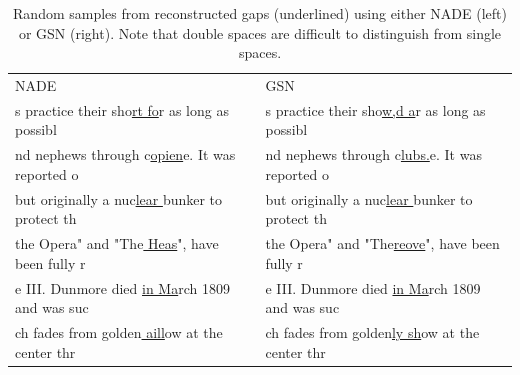 \documentclass{article}
\newenvironment{bookman}{\scriptsize\fontfamily{bch}\selectfont}{\par}
\begin{document}
\begin{table}[t]
\caption{
Random samples from reconstructed gaps (underlined) using either NADE (left) or 
GSN (right). Note that double spaces are difficult to distinguish from single 
spaces.
}
\centering
\begin{tabular}{ l  l }
\hline
\noalign{\smallskip}
NADE  & GSN \\
\noalign{\smallskip}
\hline
\noalign{\smallskip}
\begin{bookman} s practice their sho\underline{rt fo}r as long as possibl \end{bookman}  & \begin{bookman} s practice their sho\underline{w,d a}r as long as possibl \end{bookman}  \\
\begin{bookman} nd nephews through c\underline{opien}e. It was reported o \end{bookman}  & \begin{bookman} nd nephews through c\underline{lubs.}e. It was reported o \end{bookman}  \\
\begin{bookman} but originally a nuc\underline{lear }bunker to protect th \end{bookman}  & \begin{bookman} but originally a nuc\underline{lear }bunker to protect th \end{bookman}  \\
\begin{bookman}  the Opera" and "The\underline{ Heas}", have been fully r \end{bookman}  & \begin{bookman}  the Opera" and "The\underline{reove}", have been fully r \end{bookman}  \\
\begin{bookman} e III. Dunmore died \underline{in Ma}rch 1809 and was suc \end{bookman}  & \begin{bookman} e III. Dunmore died \underline{in Ma}rch 1809 and was suc \end{bookman}  \\
\begin{bookman} ch fades from golden\underline{ aill}ow at the center thr \end{bookman}  & \begin{bookman} ch fades from golden\underline{ly sh}ow at the center thr \end{bookman}  \\

\end{tabular}
\end{table}
\end{document}
